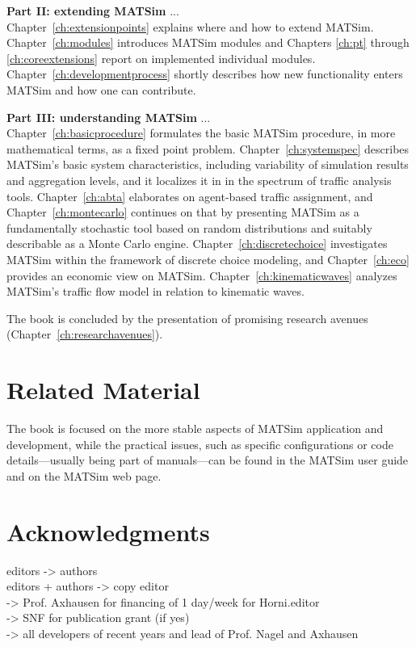 \textbf{Part II: extending MATSim} ... \\
Chapter~\ref{ch:extensionpoints} explains where and how to extend MATSim. Chapter~\ref{ch:modules} introduces MATSim modules and Chapters \ref{ch:pt} through \ref{ch:coreextensions} report on implemented individual modules. Chapter~\ref{ch:developmentprocess} shortly describes how new functionality enters MATSim and how one can contribute.

\textbf{Part III: understanding MATSim} ... \\
Chapter~\ref{ch:basicprocedure} formulates the basic MATSim procedure, in more mathematical terms, as a fixed point problem. Chapter~\ref{ch:systemspec} describes MATSim's basic system characteristics, including variability of simulation results and aggregation levels, and it localizes it in in the spectrum of traffic analysis tools. Chapter~\ref{ch:abta} elaborates on agent-based traffic assignment, and Chapter~\ref{ch:montecarlo} continues on that by presenting MATSim as a fundamentally stochastic tool based on random distributions and suitably describable as a Monte Carlo engine. Chapter~\ref{ch:discretechoice} investigates MATSim within the framework of discrete choice modeling, and Chapter~\ref{ch:eco} provides an economic view on MATSim. Chapter~\ref{ch:kinematicwaves} analyzes MATSim's traffic flow model in relation to kinematic waves.

The book is concluded by the presentation of promising research avenues (Chapter~\ref{ch:researchavenues}).

\section*{Related Material}
The book is focused on the more stable aspects of MATSim application and development, while the practical issues, such as specific configurations or code details---usually being part of manuals---can be found in the MATSim user guide \citep[][]{MATSim_Userguide_2014} and on the MATSim web page.

\section*{Acknowledgments}
editors -> authors \\
editors + authors -> copy editor \\
-> Prof. Axhausen for financing of 1 day/week for Horni.editor\\
-> SNF for publication grant (if yes) \\
-> all developers of recent years and lead of Prof. Nagel and Axhausen

